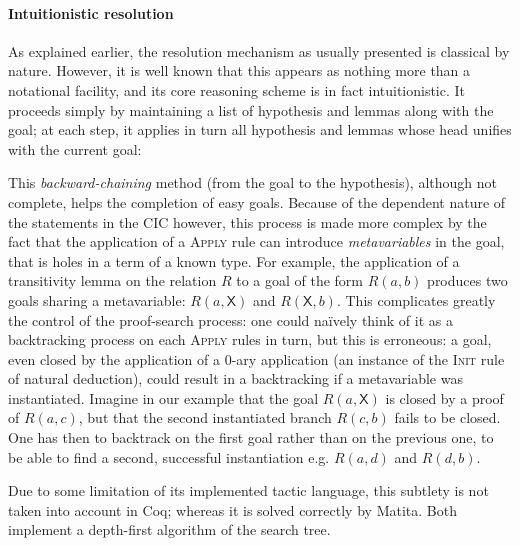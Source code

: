\documentclass[twoside,a4paper,12pt]{article}
\begin{document}
\paragraph{Intuitionistic resolution}

As explained earlier, the resolution mechanism as usually presented is
classical by nature. However, it is well known that this appears as
nothing more than a notational facility, and its core reasoning scheme
is in fact intuitionistic. It proceeds simply by maintaining a list of
hypothesis and lemmas along with the goal; at each step, it applies in
turn all hypothesis and lemmas whose head unifies with the current
goal:

This \emph{backward-chaining} method (from the goal to the
hypothesis), although not complete, helps the completion of easy
goals. Because of the dependent nature of the statements in the CIC
however, this process is made more complex by the fact that the
application of a \textsc{Apply} rule can introduce
\emph{metavariables} in the goal, that is holes in a term of a known
type. For example, the application of a transitivity lemma on the
relation $R$ to a goal of the form $R(a,b)$ produces two goals sharing
a metavariable: $R(a,\mathsf{X})$ and $R(\mathsf{X},b)$. This
complicates greatly the control of the proof-search process: one could
na\"ively think of it as a backtracking process on each \textsc{Apply}
rules in turn, but this is erroneous: a goal, even closed by the
application of a 0-ary application (an instance of the \textsc{Init}
rule of natural deduction), could result in a backtracking if a
metavariable was instantiated. Imagine in our example that the goal
$R(a,\mathsf{X})$ is closed by a proof of $R(a,c)$, but that the
second instantiated branch $R(c,b)$ fails to be closed. One has then
to backtrack on the first goal rather than on the previous one, to be
able to find a second, successful instantiation e.g. $R(a,d)$ and
$R(d,b)$.

Due to some limitation of its implemented tactic language, this
subtlety is not taken into account in \textsf{Coq}; whereas it is
solved correctly by \textsf{Matita}. Both implement a depth-first
algorithm of the search tree.
\end{document}
